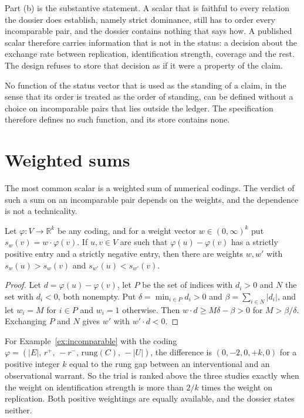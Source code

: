 Part (b) is the substantive statement. A scalar that is faithful to every relation the dossier does establish, namely strict dominance, still has to order every incomparable pair, and the dossier contains nothing that says how. A published scalar therefore carries information that is not in the status: a decision about the exchange rate between replication, identification strength, coverage and the rest. The design refuses to store that decision as if it were a property of the claim.

\begin{corollary}\label{cor:norank}
No function of the status vector that is used as the standing of a claim, in the sense that its order is treated as the order of standing, can be defined without a choice on incomparable pairs that lies outside the ledger. The specification therefore defines no such function, and its store contains none.
\end{corollary}

\section{Weighted sums}\label{sec:weights}

The most common scalar is a weighted sum of numerical codings. The verdict of such a sum on an incomparable pair depends on the weights, and the dependence is not a technicality.

\begin{proposition}\label{prop:weights}
Let $\varphi:V\to\mathbb R^k$ be any coding, and for a weight vector $w\in(0,\infty)^k$ put $s_w(v)=w\cdot\varphi(v)$. If $u,v\in V$ are such that $\varphi(u)-\varphi(v)$ has a strictly positive entry and a strictly negative entry, then there are weights $w,w'$ with $s_w(u)>s_w(v)$ and $s_{w'}(u)<s_{w'}(v)$.
\end{proposition}

\begin{proof}
Let $d=\varphi(u)-\varphi(v)$, let $P$ be the set of indices with $d_i>0$ and $N$ the set with $d_i<0$, both nonempty. Put $\delta=\min_{i\in P}d_i>0$ and $\beta=\sum_{i\in N}|d_i|$, and let $w_i=M$ for $i\in P$ and $w_i=1$ otherwise. Then $w\cdot d\ge M\delta-\beta>0$ for $M>\beta/\delta$. Exchanging $P$ and $N$ gives $w'$ with $w'\cdot d<0$.
\end{proof}

For Example~\ref{ex:incomparable} with the coding $\varphi=(|E|,\,r^+,\,-r^-,\,\mathrm{rung}(C),\,-|U|)$, the difference is $(0,-2,0,+k,0)$ for a positive integer $k$ equal to the rung gap between an interventional and an observational warrant. So the trial is ranked above the three studies exactly when the weight on identification strength is more than $2/k$ times the weight on replication. Both positive weightings are equally available, and the dossier states neither.

